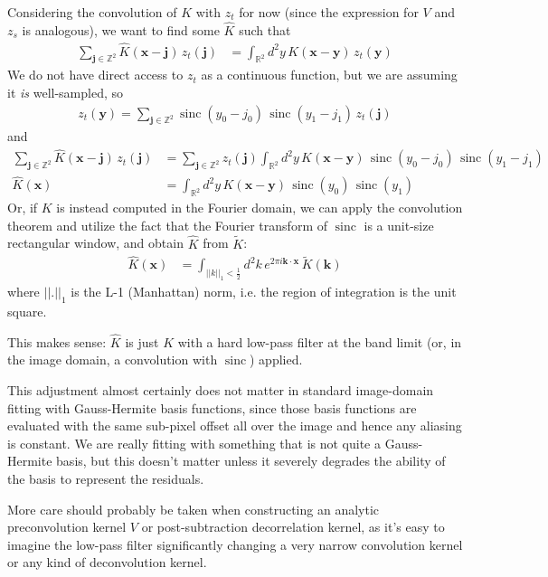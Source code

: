\documentclass[DM,authoryear,toc]{lsstdoc}
\newcommand{\AL}{\citetalias{1998ApJ...503..325A}}
\DeclareMathOperator{\sinc}{sinc}
\begin{document}
Considering the convolution of $K$ with $z_t$ for now (since the expression for $V$ and $z_s$ is analogous), we want to find some $\hat{K}$ such that
\begin{align}
  \sum_{\symbf{j} \in \mathbb{Z}^2} \hat{K}(\symbf{x}-\symbf{j}) \, z_t(\symbf{j}) & = \int_{\mathbb{R}^2} \! d^2 y \, K(\symbf{x}-\symbf{y}) \, z_t(\symbf{y})
\end{align}
We do not have direct access to $z_t$ as a continuous function, but we are assuming it \emph{is} well-sampled, so
\begin{align}
  z_t(\symbf{y}) = \sum_{\symbf{j} \in \mathbb{Z}^2} \sinc(y_0 - j_0) \, \sinc(y_1 - j_1) \, z_t(\symbf{j})
\end{align}
and
\begin{align}
  \sum_{\symbf{j} \in \mathbb{Z}^2} \hat{K}(\symbf{x}-\symbf{j}) \, z_t(\symbf{j})
  & = \sum_{\symbf{j} \in \mathbb{Z}^2} z_t(\symbf{j})
    \int_{\mathbb{R}^2} \! d^2 y \, K(\symbf{x}-\symbf{y}) \, \sinc(y_0 - j_0) \, \sinc(y_1 - j_1) \\
  \hat{K}(\symbf{x}) &= \int_{\mathbb{R}^2} \! d^2 y \, K(\symbf{x}-\symbf{y}) \, \sinc(y_0) \, \sinc(y_1)
\end{align}
Or, if $K$ is instead computed in the Fourier domain, we can apply the
convolution theorem and utilize the fact that the Fourier transform of $\sinc$
is a unit-size rectangular window, and obtain $\hat{K}$ from $\widetilde{K}$:
\begin{align}
  \hat{K}(\symbf{x}) &=
    \int_{||k||_1 < \frac{1}{2}} \! d^2 k
    \,
    e^{2\pi i \symbf{k} \cdot \symbf{x}}
    \,
    \widetilde{K}(\symbf{k})
\end{align}
where $||.||_1$ is the L-1 (Manhattan) norm, i.e. the region of integration is the unit square.

This makes sense: $\hat{K}$ is just $K$ with a hard low-pass filter at the band limit (or, in the image domain, a convolution with $\sinc$) applied.

This adjustment almost certainly does not matter in standard image-domain \AL{} fitting with Gauss-Hermite basis functions, since those basis functions are evaluated with the same sub-pixel offset all over the image and hence any aliasing is constant.
We are really fitting with something that is not quite a Gauss-Hermite basis, but this doesn't matter unless it severely degrades the ability of the basis to represent the residuals.

More care should probably be taken when constructing an analytic preconvolution kernel $V$ or post-subtraction decorrelation kernel, as it's easy to imagine the low-pass filter significantly changing a very narrow convolution kernel or any kind of deconvolution kernel.
\end{document}
